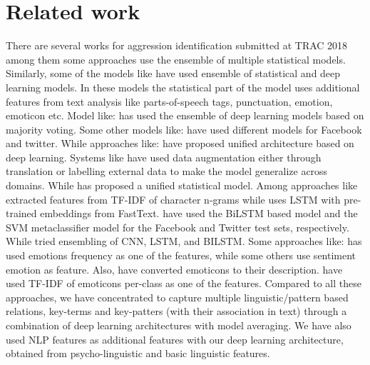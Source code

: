 \documentclass[sigconf]{acmart}
\begin{document}
\section{Related work}\label{rel_work}
There are several works for aggression identification submitted at TRAC 2018 among them some approaches use the ensemble of multiple statistical models\cite{arroyo2018cyberbullying, fortuna2018merging, samghabadi2018ritual, orasan2018aggressive}. Similarly, some of the models like\cite{risch2018aggression, tommasel2018textual, ramiandrisoa2018irit} have used ensemble of statistical and deep learning models. In these models the statistical part of the model uses additional features from text analysis like parts-of-speech tags, punctuation, emotion, emoticon etc. Model like: \cite{madisetty2018aggression} has used the ensemble of deep learning models based on majority voting. 
\newline Some other models like: \cite{majumder2018filtering, ramiandrisoa2018irit, orasan2018aggressive} have used different models for Facebook and twitter. While approaches like:\cite{aroyehun2018aggression, golem2018combining, orabi2018cyber, raiyani2018fully, nikhil2018lstms, galery2018aggression} have proposed unified architecture based on deep learning. Systems like\cite{aroyehun2018aggression, risch2018aggression, fortuna2018merging} have used data augmentation either through translation or labelling external data to make the model generalize across domains. While \cite{fortuna2018merging} has proposed a unified statistical model. 
\newline Among approaches like\cite{arroyo2018cyberbullying} extracted features from TF-IDF of character n-grams while\cite{majumder2018filtering} uses LSTM with pre-trained embeddings from FastText. \cite{golem2018combining}  have used the BiLSTM based model and the SVM metaclassifier model for the Facebook and Twitter test sets, respectively. While \cite{madisetty2018aggression} tried ensembling of CNN, LSTM, and BILSTM. 
\newline Some approaches like:\cite{ramiandrisoa2018irit} has used emotions frequency as one of the features, while some others use sentiment emotion as feature\cite{tommasel2018textual}. Also,\cite{raiyani2018fully, galery2018aggression} have converted emoticons to their description. \cite{orasan2018aggressive} have used TF-IDF of emoticons per-class as one of the features. Compared to all these approaches, we have concentrated to capture multiple linguistic/pattern based relations, key-terms and key-patters (with their association in text) through a combination of deep learning architectures with model averaging. We have also used NLP features as additional features with our deep learning architecture, obtained from psycho-linguistic and basic linguistic features.
\end{document}
